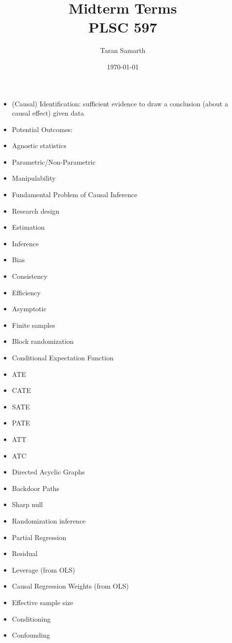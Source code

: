 \documentclass[12pt]{article}
\begin{document}
\title{Midterm Terms \\
        \large PLSC 597}

\author{Taran Samarth}
\date{\today}
\maketitle

\onehalfspacing

\begin{itemize}
\item (Causal) Identification: sufficient evidence to draw a conclusion (about a causal effect) given data
\item Potential Outcomes: 
\item Agnostic statistics
\item Parametric/Non-Parametric
\item Manipulability
\item Fundamental Problem of Causal Inference
\item Research design
\item Estimation
\item Inference
\item Bias
\item Consistency
\item Efficiency
\item Asymptotic
\item Finite samples
\item Block randomization
\item Conditional Expectation Function
\item ATE
\item CATE
\item SATE
\item PATE
\item ATT
\item ATC
\item Directed Acyclic Graphs
\item Backdoor Paths
\item Sharp null
\item Randomization inference
\item Partial Regression
\item Residual
\item Leverage (from OLS)
\item Causal Regression Weights (from OLS)
\item Effective sample size
\item Conditioning
\item Confounding

\end{itemize}
\end{document}

